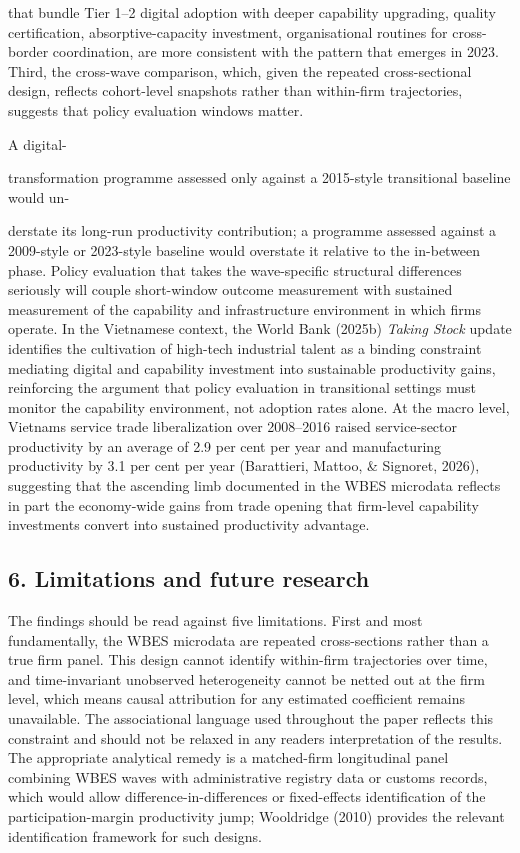 \documentclass[12pt,a4paper]{article}
\begin{document}
that bundle Tier 1--2 digital adoption with deeper capability upgrading,
quality certification, absorptive-capacity investment, organisational
routines for cross-border coordination, are more consistent with the
pattern that emerges in 2023. Third, the cross-wave comparison, which,
given the repeated cross-sectional design, reflects cohort-level
snapshots rather than within-firm trajectories, suggests that policy
evaluation windows matter.

A digital-

transformation programme assessed only against a 2015-style transitional
baseline would un-

derstate its long-run productivity contribution; a programme assessed
against a 2009-style or 2023-style baseline would overstate it relative
to the in-between phase. Policy evaluation that takes the wave-specific
structural differences seriously will couple short-window outcome
measurement with sustained measurement of the capability and
infrastructure environment in which firms operate. In the Vietnamese
context, the World Bank (2025b) \emph{Taking Stock} update identifies
the cultivation of high-tech industrial talent as a binding constraint
mediating digital and capability investment into sustainable
productivity gains, reinforcing the argument that policy evaluation in
transitional settings must monitor the capability environment, not
adoption rates alone. At the macro level, Vietnam\textquotesingle s
service trade liberalization over 2008--2016 raised service-sector
productivity by an average of 2.9 per cent per year and manufacturing
productivity by 3.1 per cent per year (Barattieri, Mattoo, \& Signoret,
2026), suggesting that the ascending limb documented in the WBES
microdata reflects in part the economy-wide gains from trade opening
that firm-level capability investments convert into sustained
productivity advantage.

\hypertarget{6-limitations-and-future-research}{%
\subsection{6. Limitations and future
research}\label{6-limitations-and-future-research}}

The findings should be read against five limitations. First and most
fundamentally, the WBES microdata are repeated cross-sections rather
than a true firm panel. This design cannot identify within-firm
trajectories over time, and time-invariant unobserved heterogeneity
cannot be netted out at the firm level, which means causal attribution
for any estimated coefficient remains unavailable. The associational
language used throughout the paper reflects this constraint and should
not be relaxed in any reader\textquotesingle s interpretation of the
results. The appropriate analytical remedy is a matched-firm
longitudinal panel combining WBES waves with administrative registry
data or customs records, which would allow difference-in-differences or
fixed-effects identification of the participation-margin productivity
jump; Wooldridge (2010) provides the relevant identification framework
for such designs.
\end{document}
